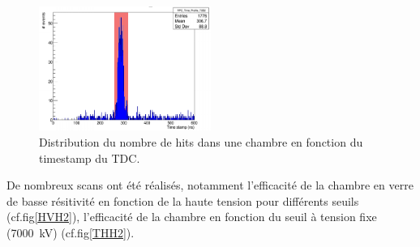 \begin{figure}[!ht]
	\centering
	\includegraphics[width=0.50\textwidth]{GLA/STRUCH2.png}
	\caption{Distribution du nombre de hits dans une chambre en fonction du timestamp du TDC.}
	\label{struch2}
\end{figure}

De nombreux scans ont été réalisés, notamment l'efficacité de la chambre en verre de basse résitivité en fonction de la haute tension pour différents seuils (cf.fig\ref{HVH2}), l'efficacité de la chambre en fonction du seuil à tension fixe (\SI{7000}{\kilo\volt}) (cf.fig\ref{THH2}).

